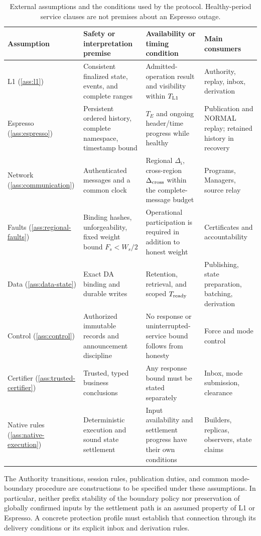 \begin{table}[htbp]
\centering\small
\caption{External assumptions and the conditions used by the protocol.
Healthy-period service clauses are not premises about an Espresso
outage.}
\label{tab:assumption-coverage}
\begin{tabularx}{\linewidth}{@{}P{.16\linewidth}P{.27\linewidth}P{.26\linewidth}Y@{}}
\toprule
Assumption & Safety or interpretation premise & Availability or timing
condition & Main consumers\\
\midrule
L1 (\ref{ass:l1}) & Consistent finalized state, events, and complete
ranges & Admitted-operation result and visibility within $T_{\rm L1}$
& Authority, replay, inbox, derivation\\
Espresso (\ref{ass:espresso}) & Persistent ordered history, complete
namespace, timestamp bound & $T_E$ and ongoing header/time progress
while healthy & Publication and NORMAL replay; retained history in recovery\\
Network (\ref{ass:communication}) & Authenticated messages and a common
clock & Regional $\Delta_i$, cross-region $\Delta_{\rm cross}$ within
the complete-message budget & Programs, Managers, source relay\\
Faults (\ref{ass:regional-faults}) & Binding hashes, unforgeability, fixed
weight bound $F_s<W_s/2$ & Operational participation is required in
addition to honest weight & Certificates and accountability\\
Data (\ref{ass:data-state}) & Exact DA binding and durable writes &
Retention, retrieval, and scoped $T_{\rm ready}$ & Publishing, state
preparation, batching, derivation\\
Control (\ref{ass:control}) & Authorized immutable records and announcement
discipline & No response or uninterrupted-service bound follows from
honesty & Force and mode control\\
Certifier (\ref{ass:trusted-certifier}) & Trusted, typed business
conclusions & Any response bound must be stated separately & Inbox,
mode submission, clearance\\
Native rules (\ref{ass:native-execution}) & Deterministic execution and
sound state settlement & Input availability and settlement progress
have their own conditions & Builders, replicas, observers, state claims\\
\bottomrule
\end{tabularx}
\end{table}

The Authority transitions, session rules, publication duties, and common
mode-boundary procedure are constructions to be specified under these
assumptions.  In particular, neither prefix stability of the boundary
policy nor preservation of globally confirmed inputs by the settlement
path is an assumed property of L1 or Espresso.  A concrete protection
profile must establish that connection through its delivery conditions
or its explicit inbox and derivation rules.

